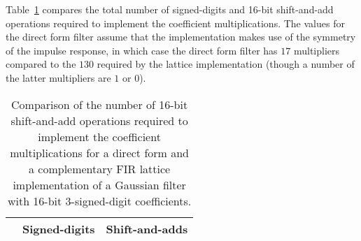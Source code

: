 \documentclass[a4paper,twoside,10pt,english]{report}
\begin{document}
Table~\ref{tab:socp-relaxation-gaussian-FIR-lattice-16-nbits-cost-comparison}
compares the total number of signed-digits and 16-bit shift-and-add operations
required to implement the coefficient multiplications. The values for the
direct form filter assume that the implementation makes use of the symmetry
of the impulse response, in which case the direct form filter has $17$
multipliers compared to the $130$ required by the lattice
implementation (though a number of the latter multipliers are $1$ or $0$).
\begin{table}[!htbp]
\centering
\begin{threeparttable}
\begin{tabular}{lcc}  \\ \toprule
&Signed-digits&Shift-and-adds\\ \midrule

\bottomrule
\end{tabular}
\end{threeparttable}
\caption[Comparison of signed-digit and shift-and-add requirements for a
direct form and a complementary FIR lattice Gaussian filter with 16 bit,
3-signed-digit coefficients] {Comparison of the number of 16-bit shift-and-add
  operations required to implement the coefficient multiplications for a
  direct form and a complementary FIR lattice implementation of a Gaussian
  filter with 16-bit 3-signed-digit coefficients.}
\label{tab:socp-relaxation-gaussian-FIR-lattice-16-nbits-cost-comparison}
\end{table}
\end{document}
